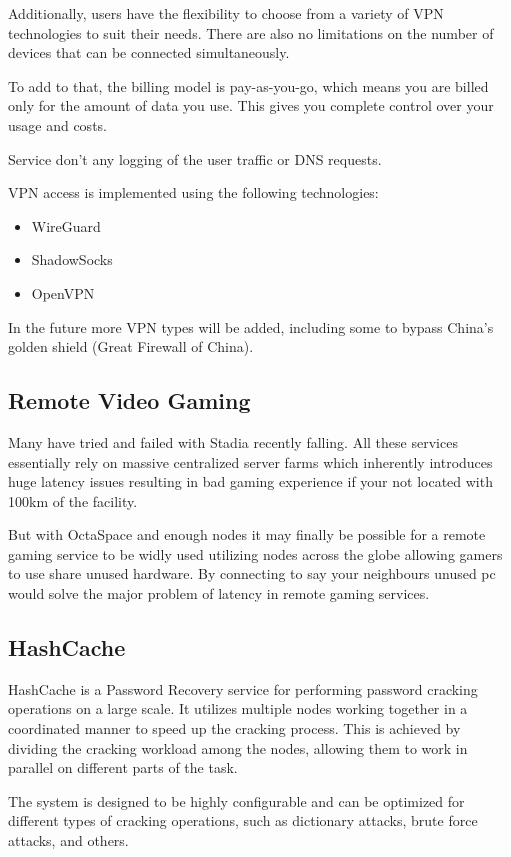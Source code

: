 Additionally, users have the flexibility to choose from a variety of VPN technologies to suit their needs.
There are also no limitations on the number of devices that can be connected simultaneously.

To add to that, the billing model is pay-as-you-go, which means you are billed only for the amount of data you use.
This gives you complete control over your usage and costs.

Service don’t any logging of the user traffic or DNS requests.

VPN access is implemented using the following technologies:

\begin{itemize}
    \item WireGuard
    \item ShadowSocks
    \item OpenVPN
\end{itemize}

In the future more VPN types will be added, including some to bypass China's golden shield (Great Firewall of China).
\subsection{Remote Video Gaming}

Many have tried and failed with Stadia recently falling. All these services essentially rely on massive centralized server farms which inherently introduces huge latency issues resulting in bad gaming experience if your not located with 100km of the facility.

But with OctaSpace and enough nodes it may finally be possible for a remote gaming service to be widly used utilizing nodes across the globe allowing gamers to use share unused hardware. By connecting to say your neighbours unused pc would solve the major problem of latency in remote gaming services.

\subsection{HashCache}

HashCache is a Password Recovery service for performing password cracking operations on a large scale. It utilizes multiple nodes working together in a coordinated manner to speed up the cracking process. This is achieved by dividing the cracking workload among the nodes, allowing them to work in parallel on different parts of the task.

The system is designed to be highly configurable and can be optimized for different types of cracking operations, such as dictionary attacks, brute force attacks, and others.

